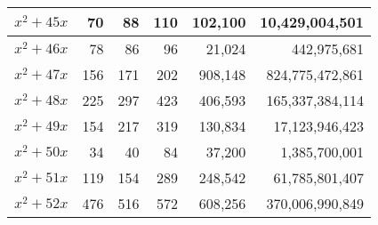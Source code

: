 \documentclass{article}
\begin{document}
\begin{center}
\begin{tabular}{ | c | r | r | r | r | r | }
$x^2 + 45x$ & 70 & 88 & 110 & 102{,}100 & 10{,}429{,}004{,}501 \\ \hline
$x^2 + 46x$ & 78 & 86 & 96 & 21{,}024 & 442{,}975{,}681 \\ \hline
$x^2 + 47x$ & 156 & 171 & 202 & 908{,}148 & 824{,}775{,}472{,}861 \\ \hline
$x^2 + 48x$ & 225 & 297 & 423 & 406{,}593 & 165{,}337{,}384{,}114 \\ \hline
$x^2 + 49x$ & 154 & 217 & 319 & 130{,}834 & 17{,}123{,}946{,}423 \\ \hline
$x^2 + 50x$ & 34 & 40 & 84 & 37{,}200 & 1{,}385{,}700{,}001 \\ \hline
$x^2 + 51x$ & 119 & 154 & 289 & 248{,}542 & 61{,}785{,}801{,}407 \\ \hline
$x^2 + 52x$ & 476 & 516 & 572 & 608{,}256 & 370{,}006{,}990{,}849 \\ \hline

\end{tabular}\pagebreak

\begin{tabular}{ | c | r | r | r | r | r | }
\hline


\end{tabular}
\end{center}
\end{document}
